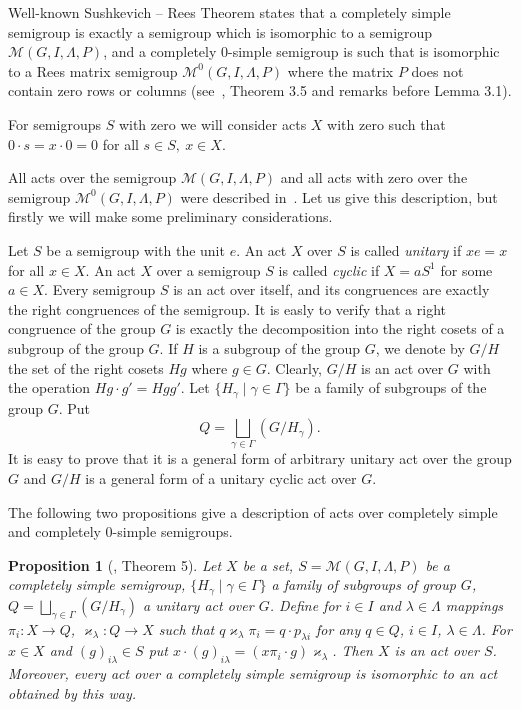 \documentclass{birkau}
\numberwithin{equation}{section}
\theoremstyle{plain}
\newtheorem{proposition}[theorem]{Proposition}
\theoremstyle{definition}
\begin{document}
	Well-known Sushkevich -- Rees Theorem states that a completely simple semigroup is exactly a semigroup which is isomorphic to a semigroup $\mathcal{M}(G, I,\Lambda,P)$, and a completely 0-simple semigroup is such that is isomorphic to a Rees matrix semigroup $\mathcal{M}^0(G,I,\Lambda,P)$ where the matrix $P$ does not contain zero rows or columns (see~\cite{cliff}, Theorem 3.5 and remarks before Lemma 3.1).
	
	For semigroups $S$ with zero we will consider acts $X$ with zero such that $0 \cdot s = x \cdot 0 = 0$ for all $s\in S,\ x\in X$.
	
	All acts over the semigroup $\mathcal{M}(G,I,\Lambda,P)$ and all acts with zero over the semigroup $\mathcal{M}^0(G,I,\Lambda,P)$ were described in~\cite{avdeev}. Let us give this description, but firstly we will make some preliminary considerations.
	
	Let $S$ be a semigroup with the unit $e$. An act $X$ over $S$ is called \textit{unitary} if $xe=x$ for all $x \in X$. An act $X$ over a semigroup $S$ is called \textit{cyclic} if $X=aS^1$ for some $a \in X$. Every semigroup $S$ is an act over itself, and its congruences are exactly the right congruences of the semigroup. It is easly to verify that a right congruence of the group $G$ is exactly the decomposition into the right cosets of a subgroup of the group $G$. If $H$ is a subgroup of the group $G$, we denote by $G/H$ the set of the right cosets $Hg$ where $g \in G$. Clearly, $G/H$ is an act over $G$ with the operation $Hg \cdot g' = Hgg'$. Let $\{ H_\gamma \mid \gamma \in \Gamma \} $ be a family of subgroups of the group $G$. Put $$ Q = \bigsqcup_{\gamma \in \Gamma} (G/H_\gamma). $$ It is easy to prove that it is a general form of arbitrary unitary act over the group $G$ and $G/H$ is a general form of a unitary cyclic act over $G$.
	
	The following two propositions give a description of acts over completely simple and completely 0-simple semigroups.
	
	\begin{proposition}[\cite{avdeev}, Theorem 5] \label{pr01}
	    Let $X$ be a set, $S=\mathcal{M}(G,I,\Lambda,P)$ be a completely simple semigroup, $\{ H_\gamma \mid \gamma \in \Gamma \}$ a family of subgroups of group $G$, $ Q = \bigsqcup_{\gamma \in \Gamma} (G/H_\gamma) $ a unitary act over $G$. Define for $ i \in I$ and $\lambda \in \Lambda$  mappings $\pi_i:X \rightarrow Q$, $\varkappa_\lambda: Q \rightarrow X$ such that $q \varkappa_\lambda \pi_i = q \cdot p_{\lambda i}$ for any $q \in Q$, $i \in I$, $\lambda \in \Lambda$. For $x \in X$ and $(g)_{i \lambda} \in S$ put $x \cdot (g)_{i \lambda} = (x \pi_i \cdot g)\varkappa_{\lambda}$. Then $X$ is an act over $S$. Moreover, every act over a completely simple semigroup is isomorphic to an act obtained by this way.
	\end{proposition}
	
\end{document}
